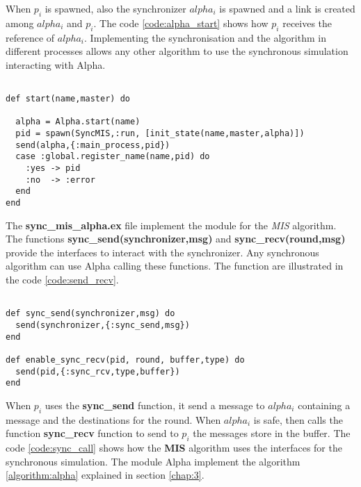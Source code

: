 When $p_i$ is spawned, also the synchronizer $alpha_i$ is spawned and a link is created among $alpha_i$ and $p_i$. The code \ref{code:alpha_start} shows how $p_i$ receives the reference of $alpha_i$.  Implementing the synchronisation and the algorithm in different processes allows any other algorithm to use the synchronous simulation interacting with Alpha.  

\begin{lstlisting}[frame=single, columns=fullflexible, mathescape=true, caption= start function for Alpha implementation , label = code:alpha_start]

def start(name,master) do

  alpha = Alpha.start(name)
  pid = spawn(SyncMIS,:run, [init_state(name,master,alpha)])
  send(alpha,{:main_process,pid})
  case :global.register_name(name,pid) do
    :yes -> pid
    :no  -> :error
  end
end

\end{lstlisting}



The \textbf{sync\_mis\_alpha.ex} file implement the module for the \textit{MIS} algorithm. The functions \textbf{sync\_send(synchronizer,msg)} and \textbf{sync\_recv(round,msg)} provide the interfaces to interact with the synchronizer. Any synchronous algorithm can use Alpha calling these functions. The function are illustrated in the code \ref{code:send_recv}.

\begin{lstlisting}[frame=single, columns=fullflexible, mathescape=true, caption= Interface to call Alpha: Synchronous send and receive, label = code:send_recv]

def sync_send(synchronizer,msg) do
  send(synchronizer,{:sync_send,msg})
end

def enable_sync_recv(pid, round, buffer,type) do
  send(pid,{:sync_rcv,type,buffer})
end

\end{lstlisting}


When $p_i$ uses the \textbf{sync\_send} function, it send a message to $alpha_i$ containing a message and the destinations for the round. When $alpha_i$ is safe, then calls the function \textbf{sync\_recv} function to send to $p_i$ the messages store in the buffer. The code \ref{code:sync_call} shows how the \textbf{MIS} algorithm uses the interfaces for the synchronous simulation. The module Alpha implement the algorithm \ref{algorithm:alpha} explained in section \ref{chap:3}.

